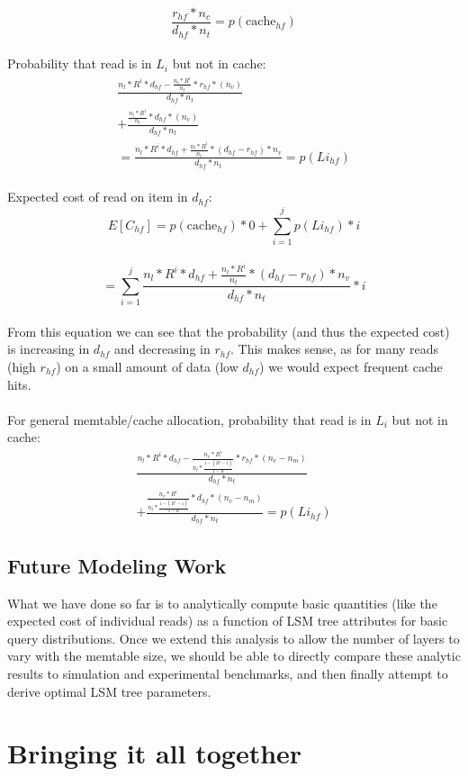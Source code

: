 \documentclass{sig-alternate-05-2015}
\begin{document}
$$\frac{r_{hf} * n_c}{d_{hf} * n_t} = p(\text{cache}_{hf})$$ \\
Probability that read is in $L_i$ but not in cache: 
\begin{multline}
\frac{n_l * R^{i}*d_{hf} - \frac{n_l * R^{i}}{n_t} * r_{hf} * (n_v)}{d_{hf} * n_t} \\+ \frac{\frac{n_l * R^{i}}{n_t} *d_{hf} *(n_v)}{d_{hf} * n_t}  \\= \frac{n_l * R^{i}*d_{hf}+ \frac{n_l * R^{i}}{n_t} * (d_{hf}-r_{hf})* n_v}{d_{hf} * n_t} = p(Li_{hf}) 
\end{multline} \\
Expected cost of read on item in $d_{hf}$: \\
$$E[C_{hf}]= p(\text{cache}_{hf}) * 0 + \sum_{i=1}^j p(Li_{hf}) * i$$\\
$$
= \sum_{i=1}^j \frac{n_l * R^{i}*d_{hf}+ \frac{n_l * R^{i}}{n_t} * (d_{hf}-r_{hf})* n_v}{d_{hf} * n_t}  * i
$$ \\
From this equation we can see that the probability (and thus the expected cost) is increasing in $d_{hf}$ and decreasing in $r_{hf}$. This makes sense, as for many reads (high $r_{hf}$) on a small amount of data (low $d_{hf}$) we would expect frequent cache hits. \\ \\
For general memtable/cache allocation, probability that read is in $L_i$ but not in cache: 
\begin{multline}
\frac{n_l * R^{i}*d_{hf} - \frac{n_v * R^{i}}{n_l * \frac{1-(R^j-1)}{1-R}} * r_{hf} * (n_v - n_m)}{d_{hf} * n_t} \\+ \frac{\frac{n_v * R^{i}}{n_l * \frac{1-(R^j-1)}{1-R}} *d_{hf} *(n_v - n_m)}{d_{hf} * n_t}  = p(Li_{hf})
\end{multline}

\subsection{Future Modeling Work}

What we have done so far is to analytically compute basic quantities (like the
expected cost of individual reads) as a function of LSM tree attributes for
basic query distributions. Once we extend this analysis to allow the number of
layers to vary with the memtable size, we should be able to directly compare
these analytic results to simulation and experimental benchmarks, and then
finally attempt to derive optimal LSM tree parameters.

\section{Bringing it all together}
\end{document}
